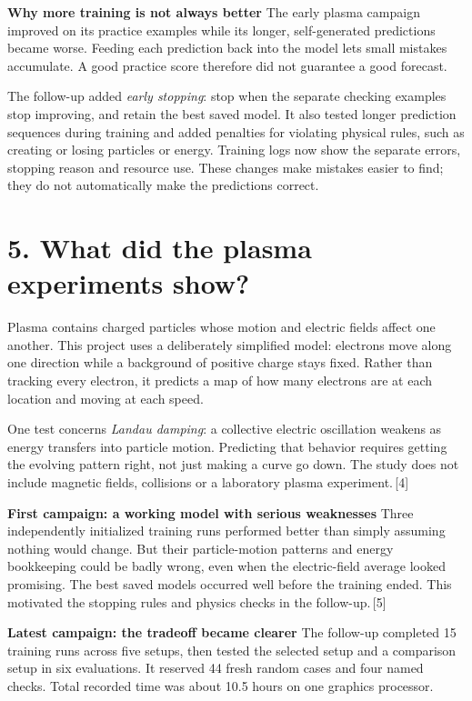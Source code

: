 \documentclass[11pt]{article}
\newcommand{\topic}[1]{\par\smallskip\noindent\textbf{#1}\quad}
\begin{document}
\topic{Why more training is not always better}
The early plasma campaign improved on its practice examples while its
longer, self-generated predictions became worse. Feeding each prediction
back into the model lets small mistakes accumulate. A good practice score
therefore did not guarantee a good forecast.

The follow-up added \emph{early stopping}: stop when the separate checking
examples stop improving, and retain the best saved model. It also tested
longer prediction sequences during training and added penalties for
violating physical rules, such as creating or losing particles or energy.
Training logs now show the separate errors,
stopping reason and resource use. These changes make mistakes easier to
find; they do not automatically make the predictions correct.

\clearpage
\section*{5. What did the plasma experiments show?}
Plasma contains charged particles whose motion and electric fields affect
one another. This project uses a deliberately simplified model: electrons
move along one direction while a background of positive charge stays fixed.
Rather than tracking every electron, it predicts a map of how many electrons
are at each location and moving at each speed.

One test concerns \emph{Landau damping}: a collective electric oscillation
weakens as energy transfers into particle motion. Predicting that behavior
requires getting the evolving pattern right, not just making a curve go down.
The study does not include magnetic fields, collisions or a laboratory
plasma experiment.\,[4]

\topic{First campaign: a working model with serious weaknesses}
Three independently initialized training runs performed better than simply
assuming nothing would change. But their particle-motion patterns and
energy bookkeeping could be badly wrong, even when the electric-field
average looked promising. The best saved models occurred well before the
training ended. This motivated the stopping rules and physics checks in
the follow-up.\,[5]

\topic{Latest campaign: the tradeoff became clearer}
The follow-up completed 15 training runs across five setups, then tested the
selected setup and a comparison setup in six evaluations. It reserved 44
fresh random cases and four named checks. Total recorded time was about
10.5 hours on one graphics processor.
\end{document}
